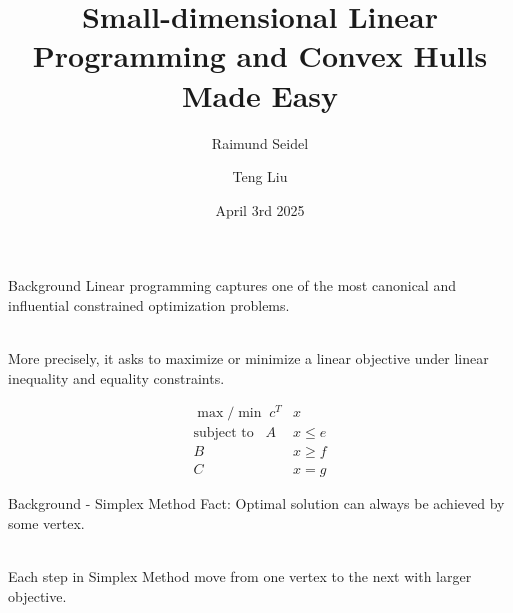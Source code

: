 \documentclass{beamer}
\title[Seminar Geometry: Combinatorics and Algorithms FS25] %
{Small-dimensional Linear Programming and Convex Hulls Made Easy}
\subtitle{Raimund Seidel}
\author[Teng Liu] %
{Teng Liu}
\date[]{April 3rd 2025}
\begin{document}
\frame{\titlepage}


\begin{frame}{Background}
    Linear programming captures one of the most canonical and influential constrained optimization problems. \\~\
    
    More precisely, it asks to maximize or minimize a linear objective under linear
inequality and equality constraints.


\begin{align*}
    \max / \min \; c^T  &x \\
   \text{subject to} \;\;\; A&x \le e \\
    B&x \ge f \\
    C&x = g
\end{align*}


\end{frame}

\begin{frame}{Background - Simplex Method}
    Fact: Optimal solution can always be achieved by some vertex. \\~\

    Each step in Simplex Method move from one vertex to the next with larger objective.
\end{frame}
\end{document}
